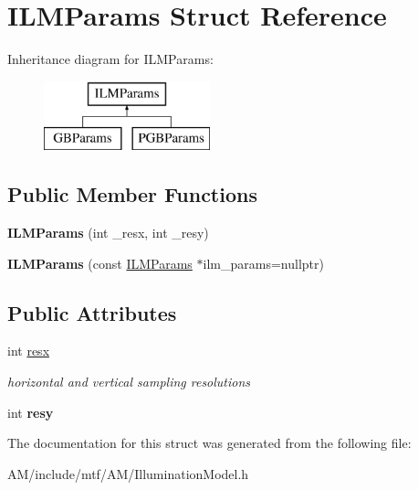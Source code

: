 \hypertarget{structILMParams}{\section{I\-L\-M\-Params Struct Reference}
\label{structILMParams}
}
Inheritance diagram for I\-L\-M\-Params\-:\begin{figure}[H]
\begin{center}
\leavevmode
\includegraphics[height=2.000000cm]{structILMParams}
\end{center}
\end{figure}
\subsection*{Public Member Functions}
\begin{DoxyCompactItemize}
\item 
\hypertarget{structILMParams_abc1c67bd1a99c21afa1269ee8871febd}{{\bfseries I\-L\-M\-Params} (int \-\_\-resx, int \-\_\-resy)}\label{structILMParams_abc1c67bd1a99c21afa1269ee8871febd}

\item 
\hypertarget{structILMParams_a4b99a98e0f116eed7abd67c960db6a72}{{\bfseries I\-L\-M\-Params} (const \hyperlink{structILMParams}{I\-L\-M\-Params} $\ast$ilm\-\_\-params=nullptr)}\label{structILMParams_a4b99a98e0f116eed7abd67c960db6a72}

\end{DoxyCompactItemize}
\subsection*{Public Attributes}
\begin{DoxyCompactItemize}
\item 
\hypertarget{structILMParams_a3be05b5483b99b430dc6442bc22e95d3}{int \hyperlink{structILMParams_a3be05b5483b99b430dc6442bc22e95d3}{resx}}\label{structILMParams_a3be05b5483b99b430dc6442bc22e95d3}

\begin{DoxyCompactList}\small\item\em horizontal and vertical sampling resolutions \end{DoxyCompactList}\item 
\hypertarget{structILMParams_a21b4270e30846afbd17cd2b730f927da}{int {\bfseries resy}}\label{structILMParams_a21b4270e30846afbd17cd2b730f927da}

\end{DoxyCompactItemize}


The documentation for this struct was generated from the following file\-:\begin{DoxyCompactItemize}
\item 
A\-M/include/mtf/\-A\-M/Illumination\-Model.\-h\end{DoxyCompactItemize}
